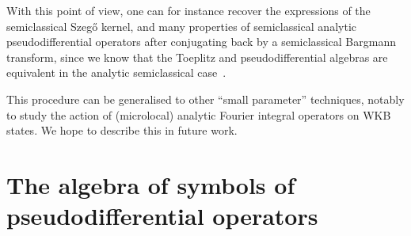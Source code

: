 \documentclass[AHL,Unicode,longabstracts,published]{cedram}
\newcommand\1{\mathds{1}}
\begin{document}
With this point of view, one can for instance recover the expressions of the semiclassical Szeg\H{o} kernel, and many properties of semiclassical analytic pseudodifferential operators after conjugating back by a semiclassical Bargmann transform, since we know that the Toeplitz and pseudodifferential algebras are equivalent in the analytic semiclassical case~\cite{rouby_analytic_2018}.

This procedure can be generalised to other ``small parameter'' techniques, notably to study the action of (microlocal) analytic Fourier integral operators on WKB states. We hope to describe this in future work.


\appendix

\section{The algebra of symbols of pseudodifferential operators}\label{sec:algebra-symb-pseud}
\end{document}
